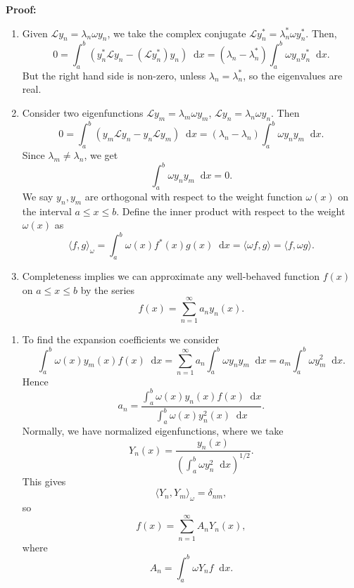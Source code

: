\documentclass[12pt]{article}
\newcommand{\diff}{\mathop{}\!\mathrm{d}}
\theoremstyle{definition}
\theoremstyle{remark}
\begin{document}
\begin{adjustbox}{minipage = \columnwidth - 25.5pt, margin=1em, frame=1pt, margin=0em}
\textbf{Proof:} 
\begin{enumerate}[1.]
	\item Given $\mathcal{L}y_n = \lambda_n \omega y_n$, we take the complex conjugate $\mathcal{L}y_n^{\ast} = \lambda_n^{\ast} \omega y_n^{\ast}$. Then,
		\[
			0 = \int_{a}^{b} (y_n^{\ast} \mathcal{L}y_n - (\mathcal{L}y_n^{\ast}) y_n)\diff x = (\lambda_n - \lambda_n^{\ast}) \int_{a}^{b} \omega y_n y_n^{\ast}\diff x
		.\]
		But the right hand side is non-zero, unless $\lambda_n = \lambda_n^{\ast}$, so the eigenvalues are real.
	\item Consider two eigenfunctions $\mathcal{L}y_m = \lambda_m \omega y_m$, $\mathcal{L}y_n = \lambda_n \omega y_n$. Then
		\[
			0 = \int_{a}^{b}(y_m \mathcal{L}y_n - y_n \mathcal{L}y_m) \diff x = (\lambda_n - \lambda_n) \int_{a}^{b} \omega y_n y_m \diff x
		.\]
		Since $\lambda_m \neq \lambda_n$, we get
		\[
		\int_{a}^{b} \omega y_n y_m \diff x = 0
		.\]
		We say $y_n, y_m$ are orthogonal with respect to the weight function $\omega(x)$ on the interval $a \leq x \leq b$. Define the inner product with respect to the weight $\omega(x)$ as
		\[
			\langle f, g \rangle_{\omega} = \int_{a}^{b} \omega(x) f^{\ast}(x) g(x) \diff x = \langle \omega f, g \rangle = \langle f, \omega g\rangle
		.\]
	\item Completeness implies we can approximate any well-behaved function $f(x)$ on $a \leq x \leq b$ by the series
		\[
			f(x) = \sum_{n = 1}^{\infty} a_n y_n(x)
		.\]
\end{enumerate}

\end{adjustbox}

\begin{adjustbox}{minipage = \columnwidth - 25.5pt, margin=1em, frame=1pt, margin=0em}
\begin{enumerate}
	\item[]	To find the expansion coefficients we consider
		\[
			\int_{a}^{b} \omega(x) y_m(x) f(x) \diff x = \sum_{n = 1}^{\infty} a_n \int_{a}^{b} \omega y_n y_m \diff x = a_m \int_{a}^{b} \omega y_m^2\diff x
		.\]
		Hence
		\[
			a_n = \frac{\int_{a}^{b} \omega(x) y_n(x) f(x) \diff x}{\int_{a}^{b}\omega(x) y_n^2(x)\diff x}
		.\]
		Normally, we have normalized eigenfunctions, where we take
		\[
			Y_n(x) = \frac{y_n(x)}{\left( \int_{a}^{b}\omega y_n^2 \diff x \right)^{1/2}}
		.\]
		This gives
		\[
			\langle Y_n, Y_m \rangle_{\omega} = \delta_{nm}
		,\]
		so
		\[
			f(x) = \sum_{n = 1}^{\infty} A_n Y_n(x)
		,\]
		where
		\[
		A_n = \int_{a}^{b} \omega Y_n f \diff x
		.\]
\end{enumerate}

\end{adjustbox}
\end{document}
